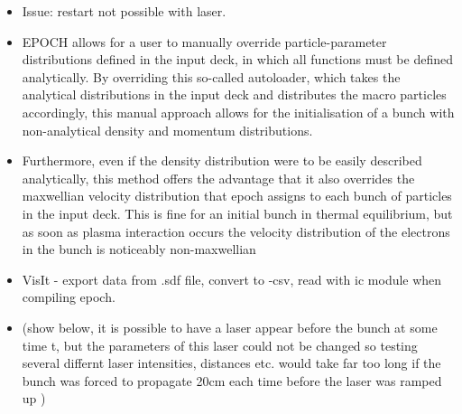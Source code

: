 \begin{itemize}
\begin{verbatim}
\end{verbatim}

\begin{itemize}
\item Issue: restart not possible with laser. 
\item EPOCH allows for a user to manually override particle-parameter distributions defined in the input deck, in which all functions must be defined analytically. By overriding this so-called autoloader, which takes the analytical distributions in the input deck and distributes the macro particles accordingly, this manual approach allows for the initialisation of a bunch with non-analytical density and momentum distributions. 
\item Furthermore, even if the density distribution were to be easily described analytically, this method offers the advantage that it also overrides the maxwellian velocity distribution that epoch assigns to each bunch of particles in the input deck. This is fine for an initial bunch in thermal equilibrium, but as soon as plasma interaction occurs the velocity distribution of the electrons in the bunch is noticeably non-maxwellian
\item VisIt - export data from .sdf file, convert to -csv, read with ic module when compiling epoch.
\item (show below, it is possible to have a laser appear before the bunch at some time t, but the parameters of this laser could not be changed so testing several differnt laser intensities, distances etc. would take far too long if the bunch was forced to propagate 20cm each time before the laser was ramped up )
\end{itemize}


\end{itemize}
